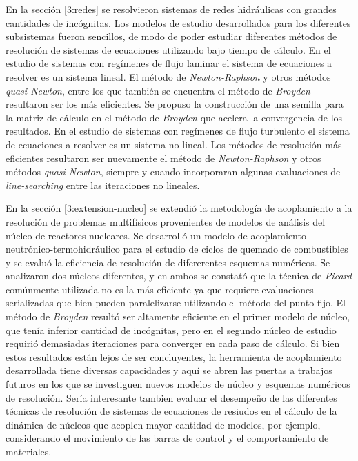En la sección \ref{3:redes} se resolvieron sistemas de redes hidráulicas con grandes cantidades de incógnitas.
Los modelos de estudio desarrollados para los diferentes subsistemas fueron sencillos,
de modo de poder estudiar diferentes métodos de resolución de sistemas de ecuaciones utilizando bajo tiempo de cálculo.
En el estudio de sistemas con regímenes de flujo laminar el sistema de ecuaciones a resolver es un sistema lineal.
El método de \textit{Newton-Raphson} y otros métodos \textit{quasi-Newton}, entre los que también se encuentra el método de \textit{Broyden} resultaron ser los más eficientes.
Se propuso la construcción de una semilla para la matriz de cálculo en el método de \textit{Broyden} que acelera la convergencia de los resultados.
En el estudio de sistemas con regímenes de flujo turbulento el sistema de ecuaciones a resolver es un sistema no lineal.
Los métodos de resolución más eficientes resultaron ser nuevamente el método de \textit{Newton-Raphson} y otros métodos \textit{quasi-Newton},
siempre y cuando incorporaran algunas evaluaciones de \textit{line-searching} entre las iteraciones no lineales.

En la sección \ref{3:extension-nucleo} se extendió la metodología de acoplamiento a la resolución de problemas multifísicos provenientes de modelos de análisis del núcleo de reactores nucleares.
Se desarrolló un modelo de acoplamiento neutrónico-termohidráulico para el estudio de ciclos de quemado de combustibles y se evaluó la eficiencia de resolución de difererentes esquemas numéricos.
Se analizaron dos núcleos diferentes, y en ambos se constató que la técnica de \textit{Picard} comúnmente utilizada no es la más eficiente ya que requiere evaluaciones serializadas
que bien pueden paralelizarse utilizando el método del punto fijo.
El método de \textit{Broyden} resultó ser altamente eficiente en el primer modelo de núcleo, que tenía inferior cantidad de incógnitas,
pero en el segundo núcleo de estudio requirió demasiadas iteraciones para converger en cada paso de cálculo.
Si bien estos resultados están lejos de ser concluyentes, la herramienta de acoplamiento desarrollada tiene diversas capacidades
y aquí se abren las puertas a trabajos futuros en los que se investiguen nuevos modelos de núcleo y esquemas numéricos de resolución.
Sería interesante tambien evaluar el desempeño de las diferentes técnicas de resolución de sistemas de ecuaciones de resiudos
en el cálculo de la dinámica de núcleos que acoplen mayor cantidad de modelos,
por ejemplo, considerando el movimiento de las barras de control y el comportamiento de materiales.

